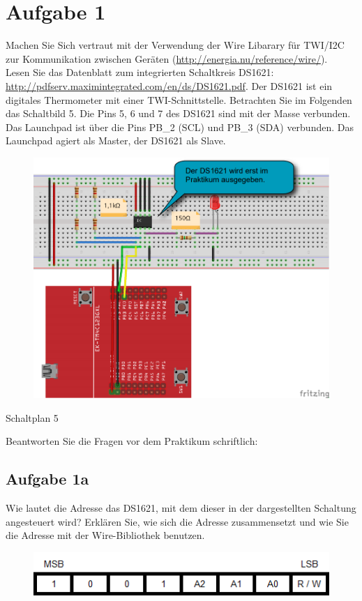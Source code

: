 \newpage
\section{Aufgabe 1}
Machen Sie Sich vertraut mit der Verwendung der Wire Libarary für TWI/I2C zur Kommunikation zwischen Geräten (\url{http://energia.nu/reference/wire/}).\\
Lesen Sie das Datenblatt zum integrierten Schaltkreis DS1621:\\
\url{http://pdfserv.maximintegrated.com/en/ds/DS1621.pdf}. Der DS1621 ist ein digitales Thermometer mit einer TWI-Schnittstelle. Betrachten Sie im Folgenden das Schaltbild 5. Die Pins 5, 6 und 7 des DS1621 sind mit der Masse verbunden. Das Launchpad ist über die Pins PB\_2 (SCL) und PB\_3 (SDA) verbunden. Das Launchpad agiert als Master, der DS1621 als Slave.
\begin{figure}[h]
	\centering
	\includegraphics[width=0.7\linewidth]{images/Schaltplan5}
	\label{fig:Schaltplan5}
\end{figure}
\begin{center}
	Schaltplan 5
\end{center}
Beantworten Sie die Fragen vor dem Praktikum schriftlich:
\subsection{Aufgabe 1a}
Wie lautet die Adresse das DS1621, mit dem dieser in der dargestellten Schaltung angesteuert wird? Erklären Sie, wie sich die Adresse zusammensetzt und wie Sie die Adresse mit der Wire-Bibliothek benutzen.
\begin{figure}[h!]
\centering
\includegraphics[width=0.7\linewidth]{images/SlaveAdresse}
\label{fig:SlaveAdresse}
\end{figure}

